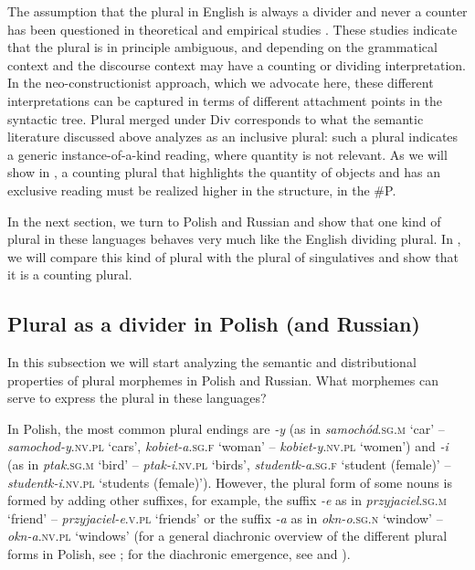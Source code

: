 \documentclass[output=paper,colorlinks,citecolor=brown,
]{langscibook}
\begin{document}
The assumption that the plural in English is always a divider and never a counter has been questioned in theoretical and empirical studies \citep{Alexiadou2019,Grimm2013}. These studies indicate that the plural is in principle ambiguous, and depending on the grammatical context and the discourse context may have a counting or dividing interpretation. In the neo-constructionist approach, which we advocate here, these different interpretations can be captured in terms of different attachment points in the syntactic tree. Plural merged under Div corresponds to what the semantic literature discussed above analyzes as an inclusive plural: such a plural indicates a generic instance-of-a-kind reading, where quantity is not relevant. As we will show in , a counting plural that highlights the quantity of objects and has an exclusive reading must be realized higher in the structure, in the \#P. 

In the next section, we turn to Polish and Russian and show that one kind of plural in these languages behaves very much like the English dividing plural. In , we will compare this kind of plural with the plural of singulatives and show that it is a counting plural.


\subsection{Plural as a divider in Polish (and Russian)}\label{sec:2.2}

In this subsection we will start analyzing the semantic and distributional properties of plural morphemes in Polish and Russian. What morphemes can serve to express the plural in these languages? 

In Polish, the most common plural endings are \textit{-y} (as in \textit{samochód}.\textsc{sg.m} `car' -- \textit{samochod-y}.\textsc{nv.pl} `cars', \textit{kobiet-a}.\textsc{sg.f} `woman' -- \textit{kobiet-y}.\textsc{nv.pl} `women') and \textit{-i} (as in \textit{ptak}.\textsc{sg.m} `bird' -- \textit{ptak-i}.\textsc{nv.pl} `birds', \textit{studentk-a}.\textsc{sg.f} `student (female)' -- \textit{studentk-i}.\textsc{nv.pl} `students (female)'). However, the plural form of some nouns is formed by adding other suffixes, for example, the suffix \textit{-e} as in \textit{przyjaciel}.\textsc{sg.m} `friend' -- \textit{przyjaciel-e}.\textsc{v.pl} `friends' or the suffix \textit{-a} as in \textit{okn-o}.\textsc{sg.n} `window' -- \textit{okn-a}.\textsc{nv.pl} `windows' (for a general diachronic overview of the different plural forms in Polish, see \citealt{Swan2002}; for the diachronic emergence, see \citealt{KlemensiewiczStanislaw1955} and \citealt{Rospond1979}).
\end{document}
